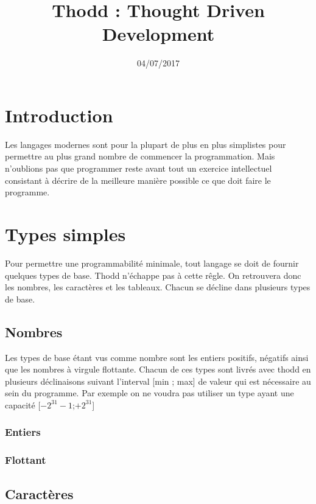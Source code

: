 \documentclass{report}
\title{Thodd : Thought Driven Development}
\date{04/07/2017}
\begin{document}
\maketitle
\tableofcontents

\newpage




\chapter{Introduction}

Les langages modernes sont pour la plupart de plus en 
plus simplistes pour permettre au plus grand nombre de 
commencer la programmation. Mais n'oublions pas que 
programmer reste avant tout un exercice intellectuel 
consistant à décrire de la meilleure manière possible 
ce que doit faire le programme. 





\chapter{Types simples}

Pour permettre une programmabilité minimale, tout langage
se doit de fournir quelques types de base. Thodd n'échappe 
pas à cette rêgle. On retrouvera donc les nombres, les 
caractères et les tableaux. Chacun se décline dans plusieurs 
types de base. 

\section{Nombres}

Les types de base étant vus comme nombre sont les entiers 
positifs, négatifs ainsi que les nombres à virgule flottante. 
Chacun de ces types sont livrés avec thodd en plusieurs 
déclinaisons suivant l'interval [min ; max] de valeur qui 
est nécessaire au sein du programme. Par exemple on ne 
voudra pas utiliser un type ayant une capacité [$-2^{31}-1$;$+2^{31}$]

\subsection{Entiers}

\subsection{Flottant}

\section{Caractères} 
\end{document}
